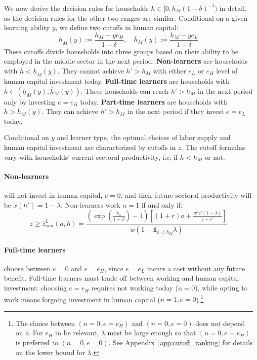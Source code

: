 \documentclass[12pt,english]{article}
\newcommand{\mathbbm}{\mathds}
\numberwithin{equation}{section}
\begin{document}
\bigskip
\noindent
We now derive the decision rules for households $h\in[0,h_M(1-\delta)^{-1})$ in detail, as the decision rules for the other two ranges are similar.
Conditional on a given learning ability $y$, we define two cutoffs in human capital:
\begin{equation}\label{eq:hm}
    \underline{h}_M(y):=\frac{h_M-ye_H}{1-\delta}, \quad\overline{h}_M(y):=\frac{h_M-ye_L}{1-\delta} 
\end{equation}
These cutoffs divide households into three groups based on their ability to be employed in the middle sector in the next period. 
\textbf{Non-learners} are households with $h < \underline{h}_M(y)$. They cannot achieve $h' > h_M$ with either $e_L$ or $e_H$ level of human capital investment today. \textbf{Full-time learners} are households with $h \in (\underline{h}_M(y), \overline{h}_M(y))$. These households can reach $h' > h_M$ in the next period only by investing $e = e_H$ today. \textbf{Part-time learners} are households with $h > \overline{h}_M(y)$. They can achieve $h' > h_M$ in the next period if they invest $e = e_L$ today. 


Conditional on $y$ and learner type, the optimal choices of labor supply and human capital investment are characterized by cutoffs in $z$. The cutoff formulas vary with households' current sectoral productivity, i.e, if $h<h_M$ or not. 


\paragraph{Non-learners} will not invest in human capital, $e=0$, and their future sectoral productivity will be $x(h')=1-\lambda$. Non-learners work $n=1$ if and only if:
\begin{equation}
    z\geq\overline{z}^L_{non}(a,h)=\frac{(\exp(\frac{\chi_n}{1+\beta})-1)\left[(1+r)a+\frac{w'z'(1-\lambda)}{1+r'}\right]}{w\left(1-\mathbbm{1}_{h < h_M}\lambda\right)}  \label{eq:z-non}
\end{equation}

\paragraph{Full-time learners} choose between $e=0$ and $e=e_H$, since $e=e_L$ incurs a cost without any future benefit. Full-time learners must trade off between working and human capital investment: choosing $e=e_H$ requires not working today ($n=0$), while opting to work means forgoing investment in human capital ($n=1, e=0$).\footnote{The choice between $(n=0,e=e_H)$ and $(n=0,e=0)$ does not depend on $z$. For $e_H$ to be relevant, $\lambda$ must be large enough so that $(n=0,e=e_H)$ is preferred to $(n=0,e=0)$. See Appendix~\ref{app:cutoff_ranking} for details on the lower bound for $\lambda$.}
\end{document}
